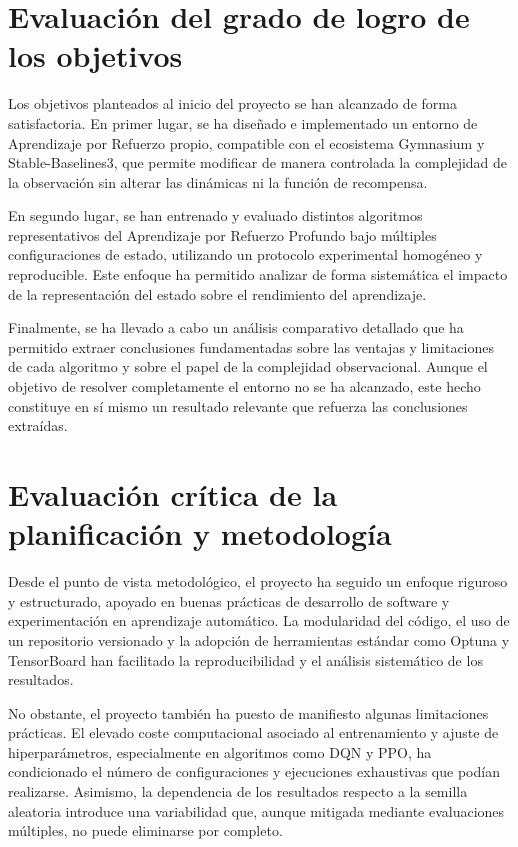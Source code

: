 \section{Evaluación del grado de logro de los objetivos}

Los objetivos planteados al inicio del proyecto se han alcanzado de forma satisfactoria. En primer lugar, se ha diseñado e implementado un entorno de Aprendizaje por Refuerzo propio, compatible con el ecosistema Gymnasium y Stable-Baselines3, que permite modificar de manera controlada la complejidad de la observación sin alterar las dinámicas ni la función de recompensa.

En segundo lugar, se han entrenado y evaluado distintos algoritmos representativos del Aprendizaje por Refuerzo Profundo bajo múltiples configuraciones de estado, utilizando un protocolo experimental homogéneo y reproducible. Este enfoque ha permitido analizar de forma sistemática el impacto de la representación del estado sobre el rendimiento del aprendizaje.

Finalmente, se ha llevado a cabo un análisis comparativo detallado que ha permitido extraer conclusiones fundamentadas sobre las ventajas y limitaciones de cada algoritmo y sobre el papel de la complejidad observacional. Aunque el objetivo de resolver completamente el entorno no se ha alcanzado, este hecho constituye en sí mismo un resultado relevante que refuerza las conclusiones extraídas.

\section{Evaluación crítica de la planificación y metodología}

Desde el punto de vista metodológico, el proyecto ha seguido un enfoque riguroso y estructurado, apoyado en buenas prácticas de desarrollo de software y experimentación en aprendizaje automático. La modularidad del código, el uso de un repositorio versionado y la adopción de herramientas estándar como Optuna y TensorBoard han facilitado la reproducibilidad y el análisis sistemático de los resultados.

No obstante, el proyecto también ha puesto de manifiesto algunas limitaciones prácticas. El elevado coste computacional asociado al entrenamiento y ajuste de hiperparámetros, especialmente en algoritmos como DQN y PPO, ha condicionado el número de configuraciones y ejecuciones exhaustivas que podían realizarse. Asimismo, la dependencia de los resultados respecto a la semilla aleatoria introduce una variabilidad que, aunque mitigada mediante evaluaciones múltiples, no puede eliminarse por completo.

